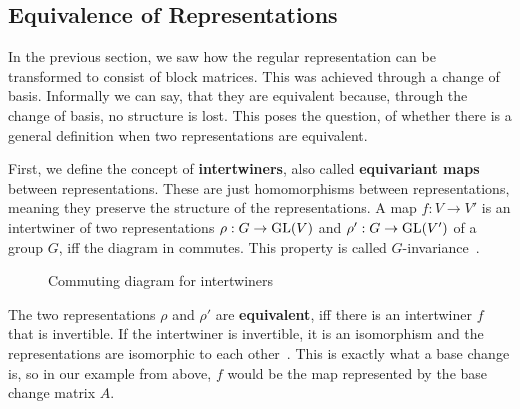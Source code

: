\subsection{Equivalence of Representations}
\label{sec:basics.equ}

In the previous section, we saw how the regular representation can be transformed to consist of block matrices.
This was achieved through a change of basis.
Informally we can say, that they are equivalent because, through the change of basis, no structure is lost.
This poses the question, of whether there is a general definition when two representations are equivalent.

First, we define the concept of \textbf{intertwiners}, also called \textbf{equivariant maps} between representations.
These are just homomorphisms between representations, meaning they preserve the structure of the representations.
A map $f: V \to V'$ is an intertwiner of two representations $\rho: G \to \operatorname{GL}(V)$ and $\rho': G \to \operatorname{GL}(V')$ of a group $G$, iff the diagram in  commutes.
This property is called $G$-invariance~\cite{fuchs2003}.

\begin{figure}[h]
    \centering
    \caption{Commuting diagram for intertwiners}
    \label{fig:main.what.equ-cd}
\end{figure}

The two representations $\rho$ and $\rho'$ are \textbf{equivalent}, iff there is an intertwiner $f$ that is invertible.
If the intertwiner is invertible, it is an isomorphism and the representations are isomorphic to each other~\cite{hein2013,fuchs2003}.
This is exactly what a base change is, so in our example from above, $f$ would be the map represented by the base change matrix $A$.
